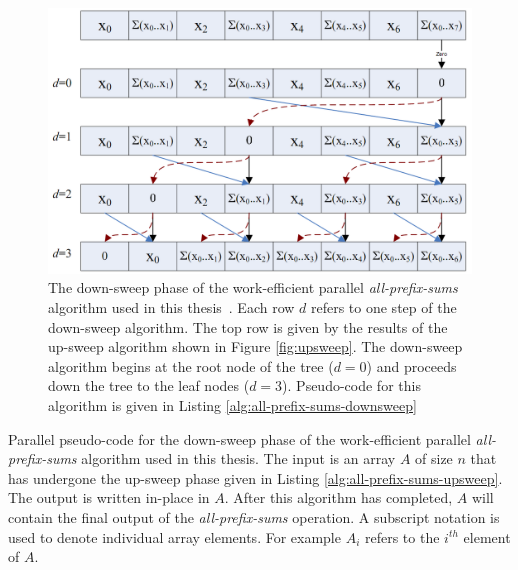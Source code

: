\clearpage
\begin{figure}[t]
\centering
\includegraphics[width=6.0in]{figures/downsweep.png}
\caption{The down-sweep phase of the work-efficient parallel \emph{all-prefix-sums} algorithm used in this thesis~\cite{Blelloch-1993,Harris-2007,Sengupta-2011}. Each row $d$ refers to one step of the down-sweep algorithm. The top row is given by the results of the up-sweep algorithm shown in Figure \ref{fig:upsweep}. The down-sweep algorithm begins at the root node of the tree ($d=0$) and proceeds down the tree to the leaf nodes ($d=3$). Pseudo-code for this algorithm is given in Listing \ref{alg:all-prefix-sums-downsweep}}
\label{fig:downsweep}
\end{figure}
\begin{Listing}[h]
    \caption{Parallel pseudo-code for the down-sweep phase of the work-efficient parallel \emph{all-prefix-sums} algorithm  used in this thesis. The input is an array $A$ of size $n$ that has undergone the up-sweep phase given in Listing \ref{alg:all-prefix-sums-upsweep}. The output is written in-place in $A$. After this algorithm has completed, $A$ will contain the final output of the \emph{all-prefix-sums} operation. A subscript notation is used to denote individual array elements. For example $A_{i}$ refers to the $i^{th}$ element of $A$.~\cite{Blelloch-1993}}
    \begin{algorithmic}[1]
            \STATE{ $ k \gets \log_2(n) - d$
            \FORALL { $ i \gets 0 \mbox{ to } n - 1 \mbox{ \ incrementing by } 2^{k} \mbox{ \ in parallel } $ } 
                \STATE { $ t \gets A_{i + 2^{k-1}-1}$ }
                \STATE { $ A_{i + 2^{k-1}-1} \gets A_{i + 2^{k}-1} $ }
                \STATE { $ A_{i + 2^{k}-1} \gets t + A_{i + 2^{k}-1} $ }
            \ENDFOR
        \ENDFOR
    \end{algorithmic}
    \label{alg:all-prefix-sums-downsweep}
\end{Listing}
\clearpage
